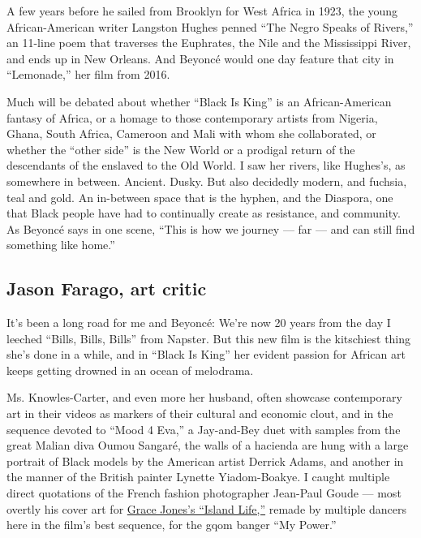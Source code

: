 A few years before he sailed from Brooklyn for West Africa in 1923, the
young African-American writer Langston Hughes penned ``The Negro Speaks
of Rivers,'' an 11-line poem that traverses the Euphrates, the Nile and
the Mississippi River, and ends up in New Orleans. And Beyoncé would one
day feature that city in ``Lemonade,'' her film from 2016.

Much will be debated about whether ``Black Is King'' is an
African-American fantasy of Africa, or a homage to those contemporary
artists from Nigeria, Ghana, South Africa, Cameroon and Mali with whom
she collaborated, or whether the ``other side'' is the New World or a
prodigal return of the descendants of the enslaved to the Old World. I
saw her rivers, like Hughes's, as somewhere in between. Ancient. Dusky.
But also decidedly modern, and fuchsia, teal and gold. An in-between
space that is the hyphen, and the Diaspora, one that Black people have
had to continually create as resistance, and community. As Beyoncé says
in one scene, ``This is how we journey --- far --- and can still find
something like home.''

\hypertarget{jason-farago-art-critic}{%
\subsection{Jason Farago, art critic}\label{jason-farago-art-critic}}

It's been a long road for me and Beyoncé: We're now 20 years from the
day I leeched ``Bills, Bills, Bills'' from Napster. But this new film is
the kitschiest thing she's done in a while, and in ``Black Is King'' her
evident passion for African art keeps getting drowned in an ocean of
melodrama.

Ms. Knowles-Carter, and even more her husband, often showcase
contemporary art in their videos as markers of their cultural and
economic clout, and in the sequence devoted to ``Mood 4 Eva,'' a
Jay-and-Bey duet with samples from the great Malian diva Oumou Sangaré,
the walls of a hacienda are hung with a large portrait of Black models
by the American artist Derrick Adams, and another in the manner of the
British painter Lynette Yiadom-Boakye. I caught multiple direct
quotations of the French fashion photographer Jean-Paul Goude --- most
overtly his cover art for
\href{https://www.discogs.com/Grace-Jones-Island-Life/master/45107}{Grace
Jones's ``Island Life,''} remade by multiple dancers here in the film's
best sequence, for the gqom banger ``My Power.''

